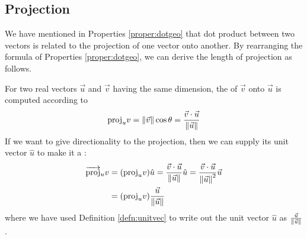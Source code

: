 \subsection{Projection}
We have mentioned in Properties \ref{proper:dotgeo} that dot product between two vectors is related to the projection of one vector onto another. By rearranging the formula of Properties \ref{proper:dotgeo}, we can derive the length of projection as follows.
\begin{center}
\end{center}
\begin{proper}
\label{proper:proj}
For two real vectors $\vec{u}$ and $\vec{v}$ having the same dimension, the  of $\vec{v}$ onto $\vec{u}$ is computed according to
\begin{align*}
\text{proj}_u v = \norm{\vec{v}} \cos\theta = \frac{\vec{v} \cdot \vec{u}}{\norm{\vec{u}}}    
\end{align*}
If we want to give directionality to the projection, then we can supply its unit vector $\hat{u}$ to make it a :
\begin{align*}
\overrightarrow{\text{proj}}_u v &= (\text{proj}_u v) \hat{u} = \frac{\vec{v} \cdot \vec{u}} {\norm{\vec{u}}} \hat{u} = \frac{\vec{v} \cdot \vec{u}}{\norm{\vec{u}}^2} \vec{u} \\
&= (\text{proj}_u v) \frac{\vec{u}}{\norm{\vec{u}}}
\end{align*}
where we have used Definition \ref{defn:unitvec} to write out the unit vector $\hat{u}$ as $\frac{\vec{u}}{\norm{\vec{u}}}$.
\end{proper}

